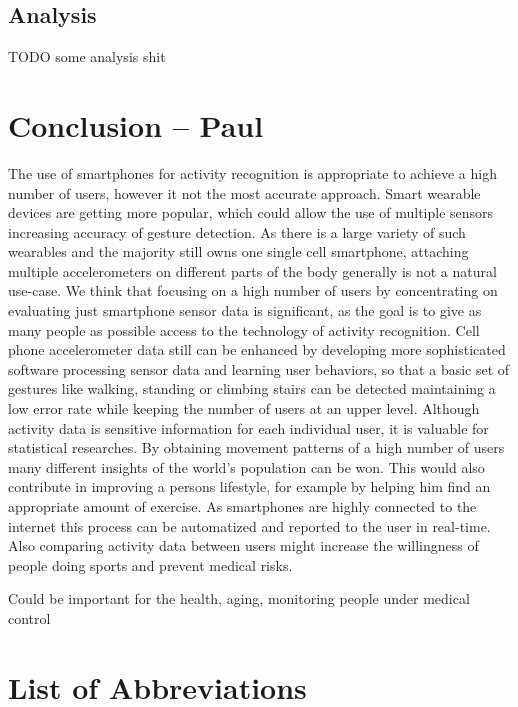 \documentclass[conference]{IEEEtran}
\begin{document}
\newpage
\subsection{Analysis}

TODO some analysis shit

\section{Conclusion -- Paul}
The use of smartphones for activity recognition is appropriate to achieve a high number of users, however it not the most accurate approach.
Smart wearable devices are getting more popular, which could allow the use of multiple sensors increasing accuracy of gesture detection. As there is a large variety of such wearables and the majority still owns one single cell smartphone, attaching multiple accelerometers  on different parts of the body generally is not a natural use-case. We think that focusing on a high number of users by concentrating on evaluating just smartphone sensor data is significant, as the goal is to give as many people as possible access to the technology of activity recognition.
Cell phone accelerometer data still can be enhanced by developing more sophisticated software processing sensor data and learning user behaviors, so that a basic set of gestures like walking, standing or climbing stairs can be detected maintaining a low error rate while keeping the number of users at an upper level.
Although activity data is sensitive information for each individual user, it is valuable for statistical researches. By obtaining movement patterns of a high number of users many different insights of the world's population can be won. This would also contribute in improving a persons lifestyle, for example by helping him find an appropriate amount of exercise. As smartphones are highly connected to the internet this process can be automatized and reported to the user in real-time. Also comparing activity data between users might increase the willingness of people doing sports and prevent medical risks.

Could be important for the health, aging, monitoring people under medical control

\section*{List of Abbreviations}
\begin{acronym}[XXXXXXXX]
\end{acronym}



%
\end{document}
